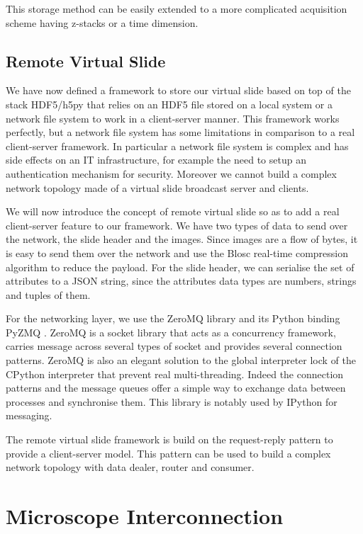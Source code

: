 \documentclass[letterpaper,compsoc,twoside]{IEEEtran}
\begin{document}
This storage method can be easily extended to a more complicated acquisition scheme having
z-stacks or a time dimension.

\subsection{Remote Virtual Slide\label{remote-virtual-slide}}


We have now defined a framework to store our virtual slide based on top of the stack HDF5/h5py that
relies on an HDF5 file stored on a local system or a network file system to work in a client-server
manner. This framework works perfectly, but a network file system has some limitations in comparison
to a real client-server framework. In particular a network file system is complex and has side
effects on an IT infrastructure, for example the need to setup an authentication mechanism for
security. Moreover we cannot build a complex network topology made of a virtual slide broadcast
server and clients.

We will now introduce the concept of remote virtual slide so as to add a real client-server feature
to our framework. We have two types of data to send over the network, the slide header and the
images. Since images are a flow of bytes, it is easy to send them over the network and use the Blosc
\cite{Blosc} real-time compression algorithm to reduce the payload. For the slide header, we can
serialise the set of attributes to a JSON \cite{JSON} string, since the attributes data types are
numbers, strings and tuples of them.

For the networking layer, we use the ZeroMQ \cite{ZMQ} library and its Python binding PyZMQ
\cite{PyZMQ}. ZeroMQ is a socket library that acts as a concurrency framework, carries message across
several types of socket and provides several connection patterns. ZeroMQ is also an elegant solution
to the global interpreter lock \cite{GIL} of the CPython interpreter that prevent real
multi-threading. Indeed the connection patterns and the message queues offer a simple way to
exchange data between processes and synchronise them. This library is notably used by IPython
\cite{IPython} for messaging.

The remote virtual slide framework is build on the request-reply pattern to provide a client-server
model. This pattern can be used to build a complex network topology with data dealer, router and
consumer.

\section{Microscope Interconnection\label{microscope-interconnection}}
\end{document}
